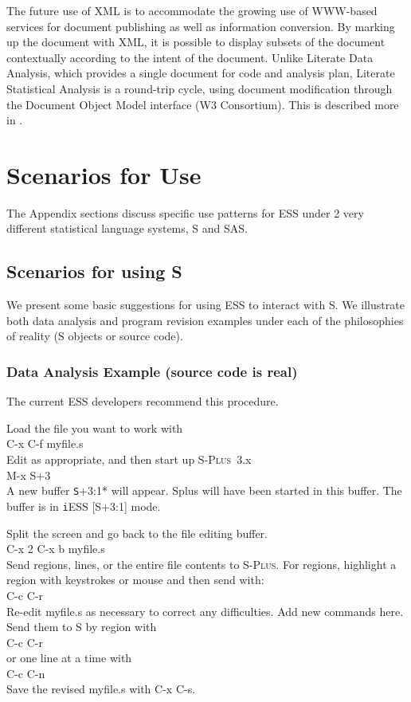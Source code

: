 \documentclass{article}
\newcommand*{\Splus}{\textsc{S-Plus}}
\newcommand{\elcode}[1]{\\{\texttt\hspace*{2em} #1}\\}
\begin{document}
The future use of XML is to accommodate the growing use of WWW-based
services for document publishing as well as information conversion.
By marking up the document with XML, it is possible to display subsets
of the document contextually according to the intent of the document.
Unlike Literate Data Analysis, which provides a single document for
code and analysis plan, Literate Statistical Analysis is a round-trip
cycle, using document modification through the Document Object Model
interface (W3 Consortium).  This is described more in
\citep{ross:lunt:2001}. 



\appendix


\section{Scenarios for Use}
\label{app:scenarios}

The Appendix sections discuss specific use patterns for ESS under 2 very
different statistical language systems, S and SAS.

\subsection{Scenarios for using S}
\label{sec:S:scenarios}

We present some basic suggestions for using ESS to interact with S.
We illustrate both data analysis and program revision examples under each of
the philosophies of reality (S objects or source code).

\subsubsection{Data Analysis Example (source code is real)}
The current ESS developers recommend this procedure.

\noindent
Load the file you want to work with
  \elcode{C-x C-f myfile.s}
Edit as appropriate, and then start up \Splus~3.x
  \elcode{M-x S+3}
A new buffer {\texttt *S+3:1*} will appear.  Splus will have been started
in this buffer.  The buffer is in {\texttt iESS [S+3:1]} mode.

Split the screen and go back to the file editing buffer.
  \elcode{C-x 2 C-x b myfile.s}
Send regions, lines, or the entire file contents to \Splus.
For regions, highlight a region with keystrokes or mouse
and then send with:
  \elcode{C-c C-r}
Re-edit myfile.s as necessary to correct any difficulties.  Add
new commands here.  Send them to S by region with
  \elcode{C-c C-r}
or one line at a time with
  \elcode{C-c C-n}
Save the revised myfile.s with C-x C-s.
\end{document}
